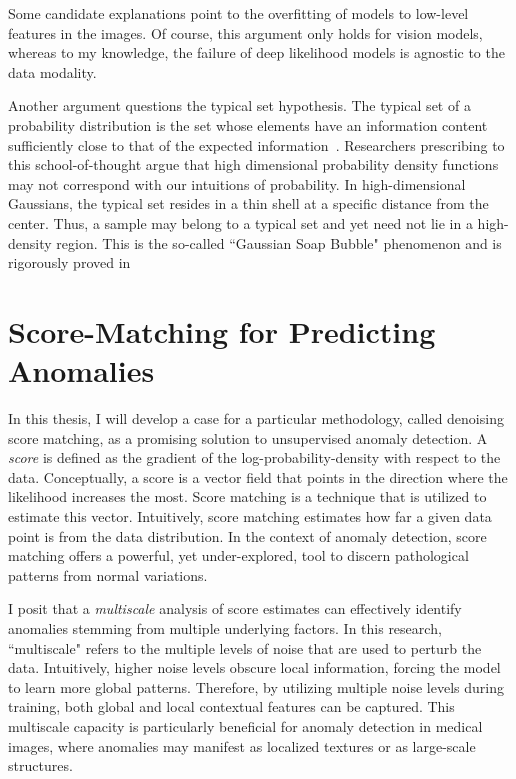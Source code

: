 Some candidate explanations point to the overfitting of models to low-level features in the images. Of course, this argument only holds for vision models, whereas to my knowledge, the failure of deep likelihood models is agnostic to the data modality.

Another argument questions the typical set hypothesis.
The typical set of a probability distribution is the set whose elements have an information content sufficiently close to that of the expected information~\cite{shannon_1948}.
Researchers prescribing to this school-of-thought argue that high dimensional probability density functions may not correspond with our intuitions of probability. In high-dimensional Gaussians, the typical set resides in a thin shell at a specific distance from the center. Thus, a sample may belong to a typical set and yet need not lie in a high-density region. This is the so-called ``Gaussian Soap Bubble" phenomenon and is rigorously proved in \cite{vershynin2018high}


\section{Score-Matching for Predicting Anomalies}

In this thesis, I will develop a case for a particular methodology, called denoising score matching, as a promising solution to unsupervised anomaly detection. A \textit{score} is defined as the gradient of the log-probability-density with respect to the data. Conceptually, a score is a vector field that points in the direction where the likelihood increases the most. Score matching is a technique that is utilized to estimate this vector. Intuitively, score matching estimates how far a given data point is from the data distribution. In the context of anomaly detection, score matching offers a powerful, yet under-explored, tool to discern pathological patterns from normal variations.

I posit that a \textit{multiscale} analysis of score estimates can effectively identify anomalies stemming from multiple underlying factors. In this research, ``multiscale" refers to the multiple levels of noise that are used to perturb the data. Intuitively, higher noise levels obscure local information, forcing the model to learn more global patterns. Therefore, by utilizing multiple noise levels during training, both global and local contextual features can be captured. This multiscale capacity is particularly beneficial for anomaly detection in medical images, where anomalies may manifest as localized textures or as large-scale structures.


